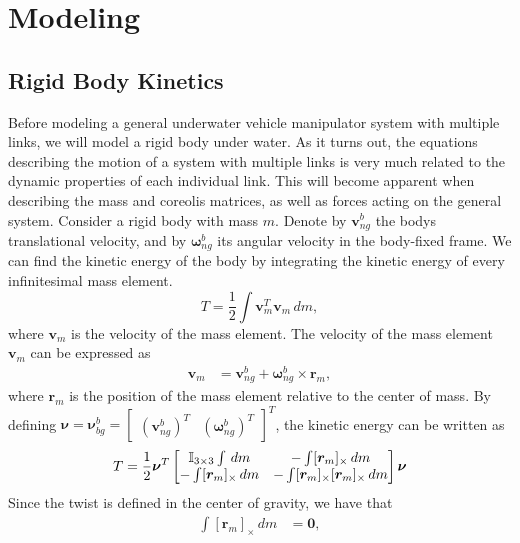 \chapter{Modeling}

\section{Rigid Body Kinetics}

Before modeling a general underwater vehicle manipulator system with multiple links, we will model
a rigid body under water. As it turns out, the equations describing the motion
of a system with multiple links is very much related to the dynamic properties
of each individual link. This will become apparent when describing the mass
and coreolis matrices, as well as forces acting on the general system.
Consider a rigid body with mass $m$. Denote by $\bm{v}_{ng}^b$ the bodys translational
velocity, and by $\bm{\omega}_{ng}^b$ its angular velocity in the
body-fixed frame. We can find the kinetic energy of the body by integrating the
kinetic energy of every infinitesimal mass element.
\begin{equation}
    T = \frac{1}{2} \int \bm{v}_m^T \bm{v}_m\, dm,
\end{equation}
where $\bm{v}_m$ is the velocity of the mass element.
The velocity of the mass element $\bm{v}_m$ can be expressed as
\begin{align}
    \bm{v}_m &= \bm{v}_{ng}^b + \bm{\omega}_{ng}^b \times \bm{r}_m,
\end{align}
where $\bm{r}_m$ is the position of the mass element relative to the center of
mass. By defining $\bm{\nu} = \bm{\nu}_{bg}^b = \begin{bmatrix}(\bm{v}_{ng}^b)^T & (\bm{\omega}_{ng}^b)^T \end{bmatrix}^T$, the kinetic energy can be written as
\begin{align}
    T = \frac{1}{2} \bm{\nu}^T
    \begin{bmatrix}
        \mathbb{I}_{3\times 3} \int \,dm & - \int [\bm{r}_m]_\times \,dm \\
        - \int [\bm{r}_m]_\times \,dm & -\int [\bm{r}_m]_\times [\bm{r}_m]_\times \,dm
    \end{bmatrix}
    \bm{\nu}\label{eq:T_body}
\end{align}
Since the twist is defined in the center of gravity, we have that
\begin{align}
    \int [\bm{r}_m]_{\times} \,dm &= \bm{0},
\end{align}
